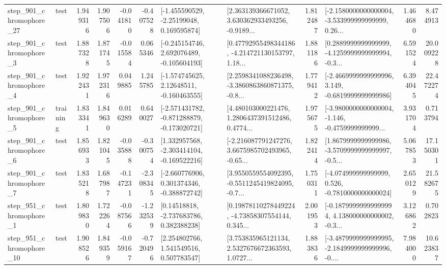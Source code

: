 \begin{tabular}{llrrrrllrlrr}
  step\_901\_chromophore\_27 &      test &      1.949316 &    1.907506 &     -0.041810 & -0.407528 &    [-1.455590529, -2.25199048, 0.169595874] &  [2.363139366671052, 3.630362933493256, -0.9189... &       1.812487 &  [-2.1580000000000004, -3.533999999999999, 0.26... &            1.464680 &          8.474913 \\
   step\_901\_chromophore\_3 &      test &      1.887328 &    1.871745 &     -0.015584 &  0.065346 &   [-0.245154746, 2.692076489, -0.105604193] &  [0.47792955498344186, -4.214721130153797, 1.18... &       1.881186 &  [0.2889999999999999, -4.1259999999999994, -0.3... &            6.591524 &         20.009228 \\
   step\_901\_chromophore\_4 &      test &      1.922431 &    1.972316 &      0.049885 &  1.245785 &    [-1.574745625, 2.12648511, -0.160463555] &  [2.2598341088236498, -3.3860863860871375, -0.8... &       1.779412 &  [-2.4669999999999996, 3.149, -0.6819999999999986] &            6.394045 &         22.472274 \\
   step\_901\_chromophore\_5 &  training &      1.833341 &    1.849630 &      0.016289 &  0.640027 &  [-2.571431782, -0.871288879, -0.173020721] &  [4.480103000221476, 1.2806437391512486, 0.4774... &       1.975675 &  [-3.9800000000000004, -1.146, -0.4759999999999... &            3.931704 &          0.713794 \\
   step\_901\_chromophore\_6 &      test &      1.856933 &    1.821045 &     -0.035888 & -0.300754 &   [1.332957568, -2.303414104, -0.169522216] &  [-2.216087791247276, 3.6675985702493965, -0.65... &       1.822414 &  [1.8679999999999986, -3.5709999999999997, -0.5... &            5.067853 &         17.150301 \\
   step\_901\_chromophore\_7 &      test &      1.835218 &    1.687987 &     -0.147231 & -2.308345 &   [-2.660776906, 0.301374346, -0.388872742] &  [3.9550559554092395, -0.5511245419824095, -0.7... &       1.750311 &   [-4.074999999999999, 0.526, -0.7810000000000024] &            2.650129 &         21.582675 \\
   step\_951\_chromophore\_1 &      test &      1.809830 &    1.722264 &     -0.087566 & -1.232539 &     [0.14518818, -2.737683786, 0.382388238] &  [0.19878110278449224, -4.73858307554144, 0.345... &       2.001953 &  [-0.18799999999999994, 4.138000000000002, -0.3... &            3.126862 &          0.702823 \\
  step\_951\_chromophore\_10 &      test &      1.908526 &    1.849359 &     -0.059167 & -0.720496 &     [2.254802766, 1.541549516, 0.507783547] &  [3.753835965121134, 2.5327676672363593, 1.0727... &       1.883836 &  [-3.4879999999999995, -2.1849999999999996, -0.... &            7.984000 &         10.623837 \\

\end{tabular}
